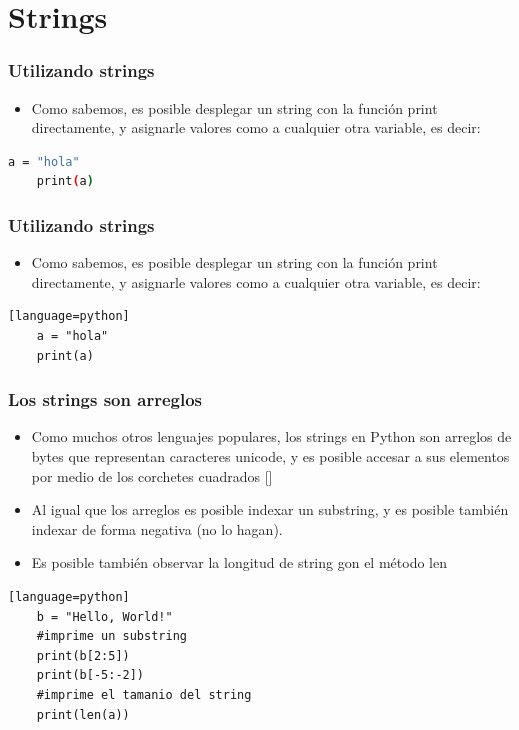 \documentclass[hyperref={pdfpagelabels=false},xcolor=pst,pdf,fragile]{beamer}
\begin{document}
\section{Strings}
\begin{frame}[fragile]
    \frametitle{Utilizando strings}
    \pause
    \begin{itemize}
    \item Como sabemos, es posible desplegar un string con la función print directamente, y asignarle valores como a cualquier otra variable, es decir:
    \end{itemize}
    
    \begin{lstlisting}[language=bash]
    a = "hola"
    print(a)
    \end{lstlisting}
\end{frame}

\begin{frame}[fragile]
    \frametitle{Utilizando strings}
    \pause
    \begin{itemize}
    \item Como sabemos, es posible desplegar un string con la función print directamente, y asignarle valores como a cualquier otra variable, es decir:
    \end{itemize}
    
    \begin{lstlisting}[basicstyle=\tiny][language=python]
    a = "hola"
    print(a)
    \end{lstlisting}
\end{frame}

\begin{frame}[fragile]
    \frametitle{Los strings son arreglos}
    \pause
    \begin{itemize}
    \item Como muchos otros lenguajes populares, los strings en Python son arreglos de bytes que representan caracteres unicode, y es posible accesar a sus elementos por medio de los corchetes cuadrados []
    \item Al igual que los arreglos es posible indexar un substring, y es posible también indexar de forma negativa (no lo hagan).
    \item Es posible también observar la longitud de string gon el método len
    \end{itemize}
    
    \begin{lstlisting}[basicstyle=\tiny][language=python]
    b = "Hello, World!"
    #imprime un substring
    print(b[2:5])
    print(b[-5:-2])
    #imprime el tamanio del string
    print(len(a))
    \end{lstlisting}
\end{frame}
\end{document}
